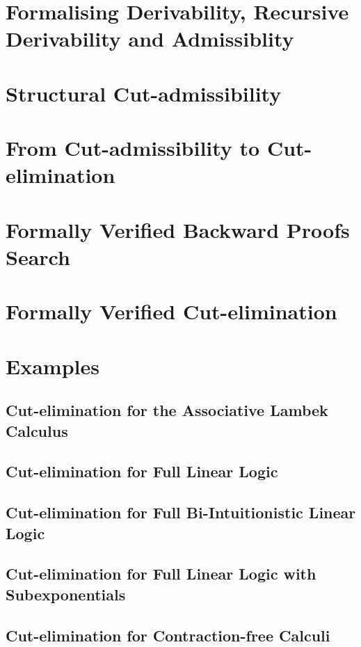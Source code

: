 \documentclass[a4paper]{article}
\begin{document}
\section{Formalising Derivability, Recursive Derivability and Admissiblity}

\section{Structural Cut-admissibility}

\section{From Cut-admissibility to Cut-elimination}

\section{Formally Verified Backward Proofs Search}

\section{Formally Verified Cut-elimination}

\section{Examples}

\subsection{Cut-elimination for the Associative Lambek Calculus}

\subsection{Cut-elimination for Full Linear Logic}

\subsection{Cut-elimination for Full Bi-Intuitionistic Linear Logic}

\subsection{Cut-elimination for Full Linear Logic with Subexponentials}

\subsection{Cut-elimination for Contraction-free Calculi}
\end{document}
